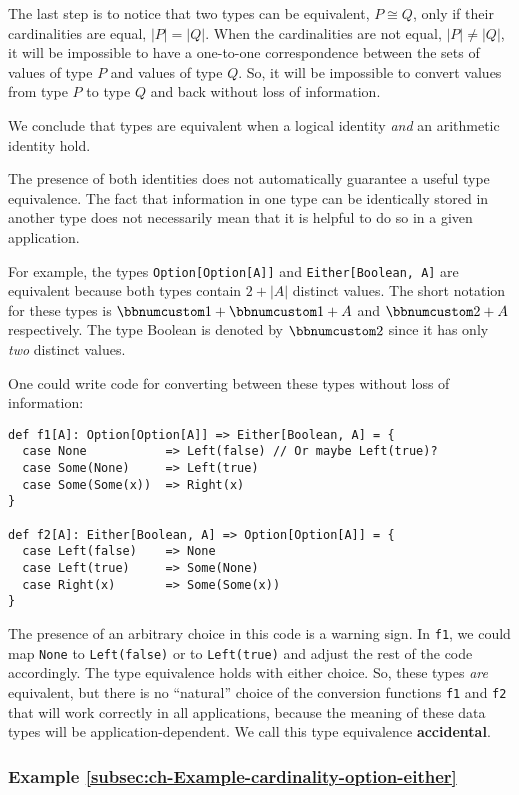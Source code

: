 The last step is to notice that two types can be equivalent, $P\cong Q$,
only if their cardinalities are equal, $\left|P\right|=\left|Q\right|$.
When the cardinalities are not equal, $\left|P\right|\neq\left|Q\right|$,
it will be impossible to have a one-to-one correspondence between
the sets of values of type $P$ and values of type $Q$. So, it will
be impossible to convert values from type $P$ to type $Q$ and back
without loss of information.

We conclude that types are equivalent when a logical identity \emph{and}
an arithmetic identity hold.

The presence of both identities does not automatically guarantee a
useful type equivalence. The fact that information in one type can
be identically stored in another type does not necessarily mean that
it is helpful to do so in a given application.

For example, the types \lstinline!Option[Option[A]]! and \lstinline!Either[Boolean, A]!
are equivalent because both types contain $2+\left|A\right|$ distinct
values. The short notation for these types is $\bbnum 1+\bbnum 1+A$
and $\bbnum 2+A$ respectively. The type Boolean is denoted by $\bbnum 2$
since it has only \emph{two} distinct values. 

One could write code for converting between these types without loss
of information:
\begin{lstlisting}
def f1[A]: Option[Option[A]] => Either[Boolean, A] = {
  case None           => Left(false) // Or maybe Left(true)?
  case Some(None)     => Left(true)
  case Some(Some(x))  => Right(x)
}

def f2[A]: Either[Boolean, A] => Option[Option[A]] = {
  case Left(false)    => None
  case Left(true)     => Some(None)
  case Right(x)       => Some(Some(x))
}
\end{lstlisting}
The presence of an arbitrary choice in this code is a warning sign.
In \lstinline!f1!, we could map \lstinline!None! to \lstinline!Left(false)!
or to \lstinline!Left(true)! and adjust the rest of the code accordingly.
The type equivalence holds with either choice. So, these types \emph{are}
equivalent, but there is no \textsf{``}natural\textsf{''} choice of the conversion
functions \lstinline!f1! and \lstinline!f2! that will work correctly
in all applications, because the meaning of these data types will
be application-dependent. We call this type equivalence \textbf{accidental}.

\subsubsection{Example \label{subsec:ch-Example-cardinality-option-either}\ref{subsec:ch-Example-cardinality-option-either}}

